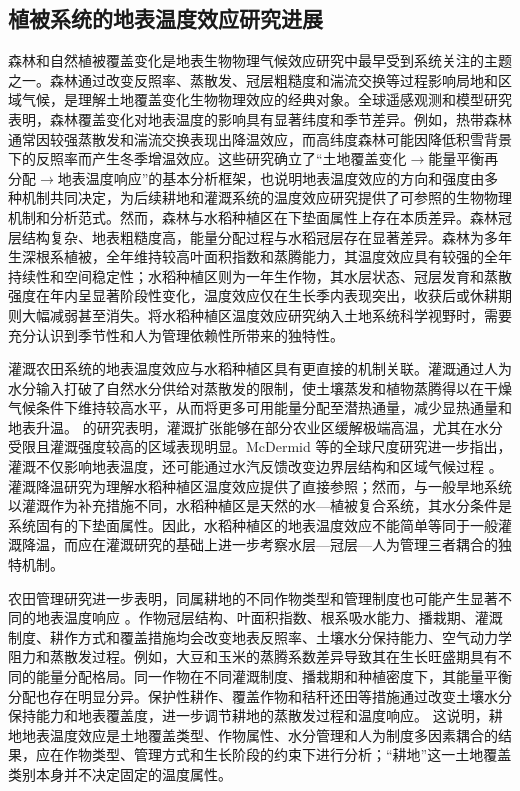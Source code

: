 \subsection{植被系统的地表温度效应研究进展}

森林和自然植被覆盖变化是地表生物物理气候效应研究中最早受到系统关注的主题之一。森林通过改变反照率、蒸散发、冠层粗糙度和湍流交换等过程影响局地和区域气候，是理解土地覆盖变化生物物理效应的经典对象\cite{Bonan2008Science}。全球遥感观测和模型研究表明，森林覆盖变化对地表温度的影响具有显著纬度和季节差异\cite{Alkama2016,Li2015NatCommun}。例如，热带森林通常因较强蒸散发和湍流交换表现出降温效应，而高纬度森林可能因降低积雪背景下的反照率而产生冬季增温效应\cite{Li2015NatCommun}。这些研究确立了“土地覆盖变化$\rightarrow$能量平衡再分配$\rightarrow$地表温度响应”的基本分析框架，也说明地表温度效应的方向和强度由多种机制共同决定，为后续耕地和灌溉系统的温度效应研究提供了可参照的生物物理机制和分析范式\cite{Bright2017LCMC}。然而，森林与水稻种植区在下垫面属性上存在本质差异。森林冠层结构复杂、地表粗糙度高，能量分配过程与水稻冠层存在显著差异。森林为多年生深根系植被，全年维持较高叶面积指数和蒸腾能力，其温度效应具有较强的全年持续性和空间稳定性；水稻种植区则为一年生作物，其水层状态、冠层发育和蒸散强度在年内呈显著阶段性变化，温度效应仅在生长季内表现突出，收获后或休耕期则大幅减弱甚至消失。将水稻种植区温度效应研究纳入土地系统科学视野时，需要充分认识到季节性和人为管理依赖性所带来的独特性。

灌溉农田系统的地表温度效应与水稻种植区具有更直接的机制关联。灌溉通过人为水分输入打破了自然水分供给对蒸散发的限制，使土壤蒸发和植物蒸腾得以在干燥气候条件下维持较高水平，从而将更多可用能量分配至潜热通量，减少显热通量和地表升温。\cite{Thiery2020Irrigation} 的研究表明，灌溉扩张能够在部分农业区缓解极端高温，尤其在水分受限且灌溉强度较高的区域表现明显。McDermid 等的全球尺度研究进一步指出，灌溉不仅影响地表温度，还可能通过水汽反馈改变边界层结构和区域气候过程 \cite{McDermid2023Irrigation} 。灌溉降温研究为理解水稻种植区温度效应提供了直接参照；然而，与一般旱地系统以灌溉作为补充措施不同，水稻种植区是天然的水—植被复合系统，其水分条件是系统固有的下垫面属性。因此，水稻种植区的地表温度效应不能简单等同于一般灌溉降温，而应在灌溉研究的基础上进一步考察水层—冠层—人为管理三者耦合的独特机制。

农田管理研究进一步表明，同属耕地的不同作物类型和管理制度也可能产生显著不同的地表温度响应 \cite{Chen2024Croplands}。作物冠层结构、叶面积指数、根系吸水能力、播栽期、灌溉制度、耕作方式和覆盖措施均会改变地表反照率、土壤水分保持能力、空气动力学阻力和蒸散发过程。例如，大豆和玉米的蒸腾系数差异导致其在生长旺盛期具有不同的能量分配格局。同一作物在不同灌溉制度、播栽期和种植密度下，其能量平衡分配也存在明显分异。保护性耕作、覆盖作物和秸秆还田等措施通过改变土壤水分保持能力和地表覆盖度，进一步调节耕地的蒸散发过程和温度响应。
这说明，耕地地表温度效应是土地覆盖类型、作物属性、水分管理和人为制度多因素耦合的结果，应在作物类型、管理方式和生长阶段的约束下进行分析；“耕地”这一土地覆盖类别本身并不决定固定的温度属性。

